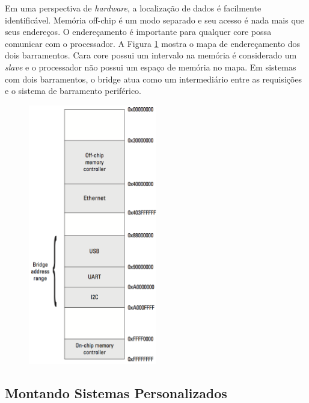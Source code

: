 Em uma perspectiva de \textit{hardware}, a localização de dados é facilmente identificável. Memória off-chip é um modo separado e seu acesso é nada mais que seus endereços. O endereçamento é importante para qualquer core possa comunicar com o processador. A Figura \ref{fig:f3-11} mostra o mapa de endereçamento dos dois barramentos. Cara core possui um intervalo na memória é considerado um \textit{\textit{slave}} e o processador não possui um espaço de memória no mapa. Em sistemas com dois barramentos, o bridge atua como um intermediário entre as requisições e o sistema de barramento periférico.



\begin{figure}[H] \centering

	\includegraphics[width=0.5\textwidth]{img/f3-11.png}

	\caption{}

	\label{fig:f3-11}

\end{figure}



\subsection{Montando Sistemas Personalizados}



